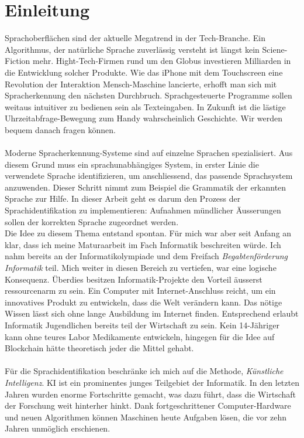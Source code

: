 \section{Einleitung}
Sprachoberflächen sind der aktuelle Megatrend in der Tech-Branche. Ein Algorithmus, der natürliche Sprache zuverlässig versteht ist längst kein Sciene-Fiction mehr. Hight-Tech-Firmen rund um den Globus investieren Milliarden in die Entwicklung solcher Produkte. Wie das iPhone mit dem Touchscreen eine Revolution der Interaktion Mensch-Maschine lancierte, erhofft man sich mit Spracherkennung den nächsten Durchbruch. Sprachgesteuerte Programme sollen weitaus intuitiver zu bedienen sein als Texteingaben. In Zukunft ist die lästige Uhrzeitabfrage-Bewegung zum Handy wahrscheinlich Geschichte. Wir werden bequem danach fragen können.
\\ \\
Moderne Spracherkennung-Systeme sind auf einzelne Sprachen spezialisiert. Aus diesem Grund muss ein sprachunabhängiges System, in erster Linie die verwendete Sprache identifizieren, um anschliessend, das passende Sprachsystem anzuwenden. Dieser Schritt nimmt zum Beispiel die Grammatik der erkannten Sprache zur Hilfe. In dieser Arbeit geht es darum den Prozess der Sprachidentifikation zu implementieren:  Aufnahmen mündlicher Äusserungen sollen der korrekten Sprache zugeordnet werden. 
\\ 
Die Idee zu diesem Thema entstand spontan. Für mich war aber seit Anfang an klar, dass ich meine Maturaarbeit im Fach Informatik beschreiten würde. Ich nahm bereits an der Informatikolympiade und dem Freifach \textit{Begabtenförderung Informatik} teil. Mich weiter in diesen Bereich zu vertiefen, war eine logische Konsequenz. Überdies besitzen Informatik-Projekte den Vorteil äusserst ressourcenarm zu sein. Ein Computer mit Internet-Anschluss reicht, um ein innovatives Produkt zu entwickeln, dass die Welt verändern kann. Das nötige Wissen lässt sich ohne lange Ausbildung im Internet finden. Entsprechend erlaubt Informatik Jugendlichen bereits  teil der Wirtschaft zu sein. Kein 14-Jähriger kann ohne teures Labor Medikamente entwickeln, hingegen für die Idee auf Blockchain hätte theoretisch jeder die Mittel gehabt.
\\ \\
Für die Sprachidentifikation beschränke ich mich auf die Methode, \textit{Künstliche Intelligenz}. KI ist ein prominentes junges Teilgebiet der Informatik. In den letzten Jahren wurden enorme Fortschritte gemacht, was dazu führt, dass die Wirtschaft der Forschung weit hinterher hinkt. Dank fortgeschrittener Computer-Hardware und neuen Algorithmen können Maschinen heute Aufgaben lösen, die vor zehn Jahren unmöglich erschienen.
